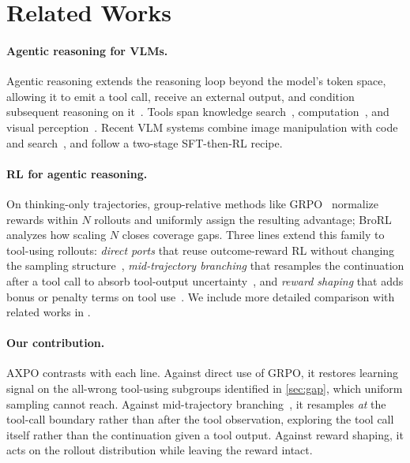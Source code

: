 \section{Related Works}
\label{sec:related}

\paragraph{Agentic reasoning for VLMs.}
Agentic reasoning extends the reasoning loop beyond the model's token space, allowing it to emit a tool call, receive an external output, and condition subsequent reasoning on it~\citep{ReAct, AgenticReasoning}. Tools span knowledge search~\citep{Search-o1, Search-R1}, computation~\citep{tora, TIR, retool, mathcoder, T1}, and visual perception~\citep{pixelreasoner, mini-o3, pyvision, deepeyes, agenticvision, thinkingwithimages}. Recent VLM systems combine image manipulation with code and search~\citep{mmsearch, deepeyesv2, pyvision-rl, visualsketchpad, vthinker}, and follow a two-stage SFT-then-RL recipe.

\paragraph{RL for agentic reasoning.}
On thinking-only trajectories, group-relative methods like GRPO~\citep{GRPO, DAPO, prorl} normalize rewards within $N$ rollouts and uniformly assign the resulting advantage; BroRL~\citep{brorl} analyzes how scaling $N$ closes coverage gaps. Three lines extend this family to tool-using rollouts: \emph{direct ports} that reuse outcome-reward RL without changing the sampling structure~\citep{deepeyes, deepeyesv2, rstar2, ToolRL, torl, thyme, AgenticReasoningRL, hrmmsearch}, \emph{mid-trajectory branching} that resamples the continuation after a tool call to absorb tool-output uncertainty~\citep{arpo, aepo}, and \emph{reward shaping} that adds bonus or penalty terms on tool use~\citep{pyvision-rl, otc}. We include more detailed comparison with related works in .

\paragraph{Our contribution.}
AXPO contrasts with each line. Against direct use of GRPO, it restores learning signal on the all-wrong tool-using subgroups identified in \autoref{sec:gap}, which uniform sampling cannot reach. Against mid-trajectory branching~\citep{arpo, aepo}, it resamples \emph{at} the tool-call boundary rather than after the tool observation, exploring the tool call itself rather than the continuation given a tool output. Against reward shaping, it acts on the rollout distribution while leaving the reward intact.
